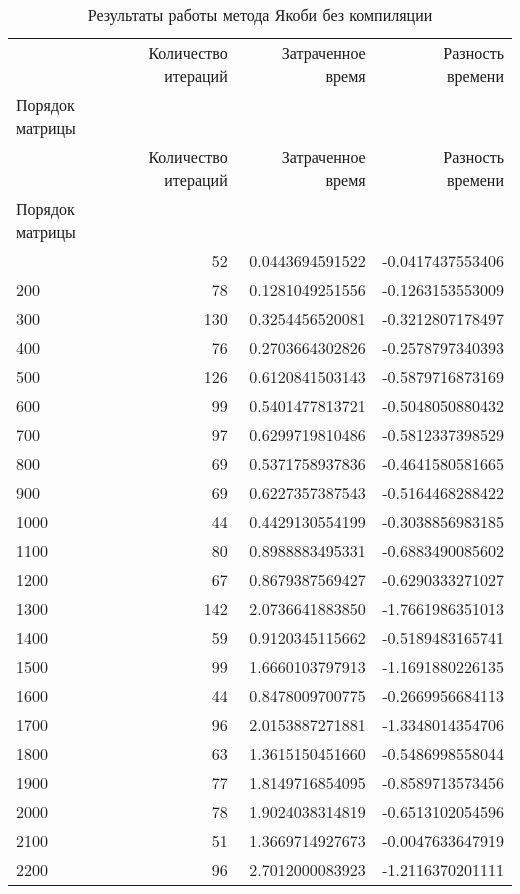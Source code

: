 \begin{longtable}{lrrr}
\label{d1}\\
\caption{Результаты работы метода Якоби без компиляции}\\
\toprule
 & Количество итераций & Затраченное время & Разность времени \\
Порядок матрицы &  &  &  \\
\midrule
\endfirsthead
\toprule
 & Количество итераций & Затраченное время & Разность времени \\
Порядок матрицы &  &  &  \\
\midrule
\endhead
\midrule
\midrule
\endfoot
\bottomrule
\endlastfoot
100 & 52 & 0.0443694591522 & -0.0417437553406 \\
200 & 78 & 0.1281049251556 & -0.1263153553009 \\
300 & 130 & 0.3254456520081 & -0.3212807178497 \\
400 & 76 & 0.2703664302826 & -0.2578797340393 \\
500 & 126 & 0.6120841503143 & -0.5879716873169 \\
600 & 99 & 0.5401477813721 & -0.5048050880432 \\
700 & 97 & 0.6299719810486 & -0.5812337398529 \\
800 & 69 & 0.5371758937836 & -0.4641580581665 \\
900 & 69 & 0.6227357387543 & -0.5164468288422 \\
1000 & 44 & 0.4429130554199 & -0.3038856983185 \\
1100 & 80 & 0.8988883495331 & -0.6883490085602 \\
1200 & 67 & 0.8679387569427 & -0.6290333271027 \\
1300 & 142 & 2.0736641883850 & -1.7661986351013 \\
1400 & 59 & 0.9120345115662 & -0.5189483165741 \\
1500 & 99 & 1.6660103797913 & -1.1691880226135 \\
1600 & 44 & 0.8478009700775 & -0.2669956684113 \\
1700 & 96 & 2.0153887271881 & -1.3348014354706 \\
1800 & 63 & 1.3615150451660 & -0.5486998558044 \\
1900 & 77 & 1.8149716854095 & -0.8589713573456 \\
2000 & 78 & 1.9024038314819 & -0.6513102054596 \\
2100 & 51 & 1.3669714927673 & -0.0047633647919 \\
2200 & 96 & 2.7012000083923 & -1.2116370201111 \\

\end{longtable}
